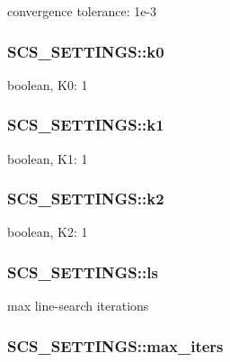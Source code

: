 convergence tolerance\-: 1e-\/3 \hypertarget{struct_s_c_s___s_e_t_t_i_n_g_s_affbf198622170170a757ff2a1ac25aa9}{
\subsubsection[{k0}]{ S\-C\-S\-\_\-\-S\-E\-T\-T\-I\-N\-G\-S\-::k0}}\label{struct_s_c_s___s_e_t_t_i_n_g_s_affbf198622170170a757ff2a1ac25aa9}
boolean, K0\-: 1 \hypertarget{struct_s_c_s___s_e_t_t_i_n_g_s_aa261f1b4c27efee39b31dceb0d6b497a}{
\subsubsection[{k1}]{ S\-C\-S\-\_\-\-S\-E\-T\-T\-I\-N\-G\-S\-::k1}}\label{struct_s_c_s___s_e_t_t_i_n_g_s_aa261f1b4c27efee39b31dceb0d6b497a}
boolean, K1\-: 1 \hypertarget{struct_s_c_s___s_e_t_t_i_n_g_s_a2c7ad16b3c1adf90105056eadb5d91a0}{
\subsubsection[{k2}]{ S\-C\-S\-\_\-\-S\-E\-T\-T\-I\-N\-G\-S\-::k2}}\label{struct_s_c_s___s_e_t_t_i_n_g_s_a2c7ad16b3c1adf90105056eadb5d91a0}
boolean, K2\-: 1 \hypertarget{struct_s_c_s___s_e_t_t_i_n_g_s_a66d58b34ddf50b3f75985729cdaef268}{
\subsubsection[{ls}]{ S\-C\-S\-\_\-\-S\-E\-T\-T\-I\-N\-G\-S\-::ls}}\label{struct_s_c_s___s_e_t_t_i_n_g_s_a66d58b34ddf50b3f75985729cdaef268}
max line-\/search iterations \hypertarget{struct_s_c_s___s_e_t_t_i_n_g_s_ab85a3495a03980ebb813b017fef244e0}{
\subsubsection[{max\-\_\-iters}]{ S\-C\-S\-\_\-\-S\-E\-T\-T\-I\-N\-G\-S\-::max\-\_\-iters}}\label{struct_s_c_s___s_e_t_t_i_n_g_s_ab85a3495a03980ebb813b017fef244e0}

